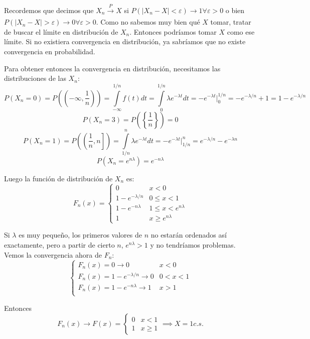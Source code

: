 \documentclass[openany]{book}
\begin{document}
\begin{exercise}
    $  $

    Recordemos que decimos que $ X_n\xrightarrow[]{P}X $ si $ P(|X_n-X|<\varepsilon) \to 1 \forall \varepsilon>0 $ o bien $ P(|X_n-X|>\varepsilon) \to 0 \forall \varepsilon>0 $. Como no sabemos muy bien qué $ X $ tomar, tratar de buscar el límite en distribución de $ X_n $. Entonces podríamos tomar $ X $ como ese límite. Si no existiera convergencia en distribución, ya sabríamos que no existe convergencia en probabilidad.

    Para obtener entonces la convergencia en distribución, necesitamos las distribuciones de las $ X_n $:
    $$ P(X_n = 0) = P((-\infty,\dfrac{1}{n})) = \int\limits_{-\infty}^{1/n}f(t)dt = \int\limits_{0}^{1/n} \lambda e^{-\lambda t}dt = -e^{-\lambda t} \Biggr|_{0}^{1/n} = -e^{-\lambda/n}+1 = 1-e^{-\lambda/n}$$
    $$ P(X_n = 3) = P\left(\left\{\dfrac{1}{n}\right\}\right) = 0 $$
    $$ P(X_n = 1) = P\left(\left(\dfrac{1}{n},n\right]\right) = \int\limits_{1/n}^{n} \lambda e^{-\lambda t}dt = -e^{-\lambda t} \Biggr|_{1/n}^{n} = e^{-\lambda/n} - e^{-\lambda n} $$
    $$ P(X_n = e^{n \lambda}) = e^{-n \lambda} $$

    Luego la función de distribución de $ X_n $ es:
    $$ F_n(x) = \left\{
    \begin{array}{ll}
        0 & x < 0 \\ 
        1-e^{-\lambda/n} & 0\leq  x< 1\\ 
        1-e^{-n \lambda} & 1\leq  x< e^{n \lambda}\\ 
        1 & x \geq  e^{n \lambda}
    \end{array}
    \right. $$
    
    Si $ \lambda $ es muy pequeño, los primeros valores de $ n $ no estarán ordenados así exactamente, pero a partir de cierto $ n $, $ e^{n\lambda} > 1 $ y no tendríamos problemas. Vemos la convergencia ahora de $ F_n $:
    $$ \left\{
    \begin{array}{ll}
        
        F_n(x) = 0 \to 0 & x<0 \\ 
        F_n(x) = 1-e^{-\lambda/n} \to 0 & 0<x<1 \\ 
        F_n(x) = 1-e^{-n \lambda} \to 1 & x>1\\ 
    \end{array}
    \right. $$

    Entonces 
    $$ F_n(x) \to F(x) = \left\{
    \begin{array}{ll}
        0 & x<1 \\ 
        1 & x\geq  1
    \end{array}
    \right. \implies X = 1 c.s. $$
    

\end{exercise}
\end{document}
